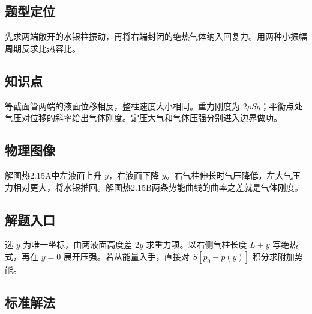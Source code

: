 \documentclass[UTF8,fontset=fandol,a4paper,11pt]{ctexart}
\begin{document}


\subsection*{题型定位}

先求两端敞开的水银柱振动，再将右端封闭的绝热气体纳入回复力。用两种小振幅周期反求比热容比。



\subsection*{知识点}

等截面管两端的液面位移相反，整柱速度大小相同。重力刚度为 $2\rho Sg$；平衡点处气压对位移的斜率给出气体刚度。定压大气和气体压强分别进入边界做功。




\subsection*{物理图像}

解图热2.15A中左液面上升 $y$，右液面下降 $y$。右气柱伸长时气压降低，左大气压力相对更大，将水银推回。解图热2.15B两条势能曲线的曲率之差就是气体刚度。



\subsection*{解题入口}

选 $y$ 为唯一坐标，由两液面高度差 $2y$ 求重力项。以右侧气柱长度 $L+y$ 写绝热式，再在 $y=0$ 展开压强。若从能量入手，直接对 $S[p_0-p(y)]$ 积分求附加势能。




\subsection*{标准解法}
\end{document}
